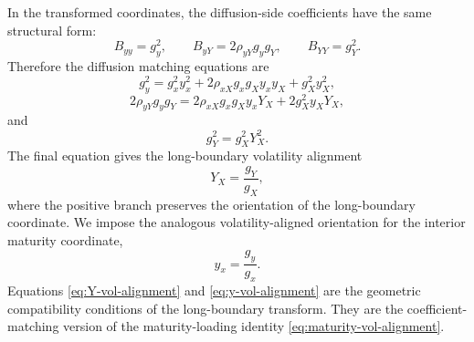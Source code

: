 \documentclass[11pt]{article}
\numberwithin{equation}{section}
\begin{document}
In the transformed coordinates, the diffusion-side coefficients have the same structural form:
\begin{equation}
\label{eq:yY-diffusion-coefficients}
B_{yy}=g_y^2,
\qquad
B_{yY}=2\rho_{yY}g_yg_Y,
\qquad
B_{YY}=g_Y^2.
\end{equation}
Therefore the diffusion matching equations are
\begin{equation}
\label{eq:diff-match-yy}
g_y^2
=
g_x^2y_x^2
+
2\rho_{xX}g_xg_Xy_xy_X
+
g_X^2y_X^2,
\end{equation}
\begin{equation}
\label{eq:diff-match-yY}
2\rho_{yY}g_yg_Y
=
2\rho_{xX}g_xg_Xy_xY_X
+
2g_X^2y_XY_X,
\end{equation}
and
\begin{equation}
\label{eq:diff-match-YY}
g_Y^2=g_X^2Y_X^2.
\end{equation}
The final equation gives the long-boundary volatility alignment
\begin{equation}
\label{eq:Y-vol-alignment}
Y_X=\frac{g_Y}{g_X},
\end{equation}
where the positive branch preserves the orientation of the long-boundary coordinate. We impose the analogous volatility-aligned orientation for the interior maturity coordinate,
\begin{equation}
\label{eq:y-vol-alignment}
y_x=\frac{g_y}{g_x}.
\end{equation}
Equations \eqref{eq:Y-vol-alignment} and \eqref{eq:y-vol-alignment} are the geometric compatibility conditions of the long-boundary transform. They are the coefficient-matching version of the maturity-loading identity \eqref{eq:maturity-vol-alignment}.
\end{document}
